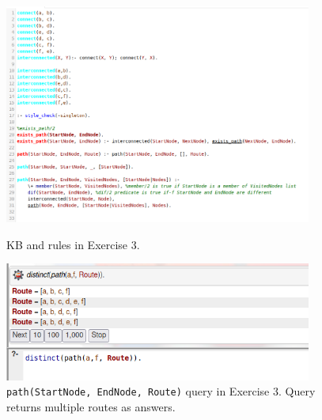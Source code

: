 \documentclass{article}
\def\code#1{\texttt{#1}}
\begin{document}
    \begin{figure}
    	\centering
    	\begin{minipage}{0.55\textwidth}
    		\centering
    		\includegraphics[width=0.9\textwidth]{images/ex3_input} 
    		\caption{KB and rules in Exercise 3.}
    	\end{minipage}\hfill
    	\begin{minipage}{0.45\textwidth}
    		\centering
    		\includegraphics[width=0.9\textwidth]{images/ex3_output} 
    		\caption{\code{path(StartNode, EndNode, Route)} query in Exercise 3. Query returns multiple routes as answers.}
    	\end{minipage}
    \end{figure}
    
    \newpage
    
\end{document}
